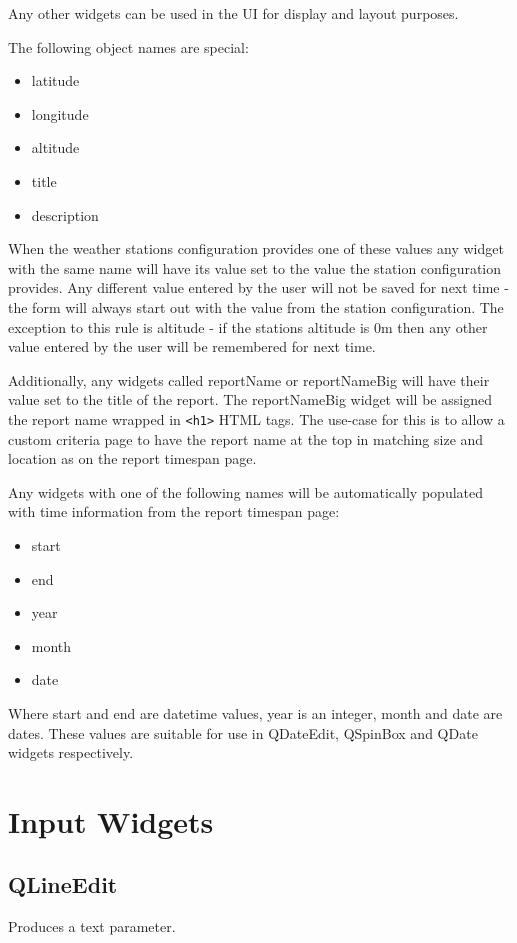 \documentclass[a4paper,10pt]{book}
\begin{document}
Any other  widgets can be used in the UI for display and layout purposes.

The following object names are special:
\begin{itemize}
\item latitude
\item longitude
\item altitude
\item title
\item description
\end{itemize}
When the weather stations configuration provides one of these values any widget with the same name will have its value set to the value the station configuration provides. Any different value entered by the user will not be saved for next time - the form will always start out with the value from the station configuration. The exception to this rule is altitude - if the stations altitude is 0m then any other value entered by the user will be remembered for next time.

Additionally, any widgets called reportName or reportNameBig will have their value set to the title of the report. The reportNameBig widget will be assigned the report name wrapped in \verb|<h1>| HTML tags. The use-case for this is to allow a custom criteria page to have the report name at the top in matching size and location as on the report timespan page.

Any widgets with one of the following names will be automatically populated with time information from the report timespan page:
\begin{itemize}
\item start
\item end
\item year
\item month
\item date
\end{itemize}
Where start and end are datetime values, year is an integer, month and date are dates. These values are suitable for use in QDateEdit, QSpinBox and QDate widgets respectively.

\section{Input Widgets}
\subsection{QLineEdit}
Produces a text parameter.
\end{document}
